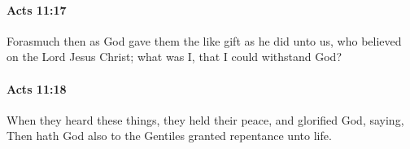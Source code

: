		\paragraph{Acts 11:17} %
			\label{ACTS-11-17}

			Forasmuch then as God gave them the like gift as he did unto us, who believed on the Lord Jesus Christ; what was I, that I could withstand God?

			\begin{framed}
			\scriptsize
				\begin{compactdesc}
					\item[SBLG] 
				\end{compactdesc}
			\end{framed}

		\paragraph{Acts 11:18} %
			\label{ACTS-11-18}

			When they heard these things, they held their peace, and glorified God, saying, Then hath God also to the Gentiles granted repentance unto life.

